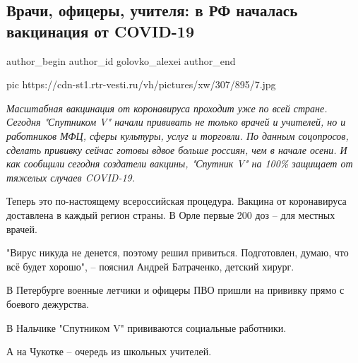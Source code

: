  
 
 
 
 
 
\subsection{Врачи, офицеры, учителя: в РФ началась вакцинация от COVID-19}
\label{sec:14_12_2020.news.ru.vesti.golovko_alexei.1.vaccination_sputnik_v}
\ifcmt
	author_begin
   author_id golovko_alexei
	author_end
\fi


\ifcmt
pic https://cdn-st1.rtr-vesti.ru/vh/pictures/xw/307/895/7.jpg
\fi

\begin{leftbar}
	\begingroup
		\em Масштабная вакцинация от коронавируса проходит уже по всей стране.
				Сегодня "Спутником V" начали прививать не только врачей и учителей, но
				и работников МФЦ, сферы культуры, услуг и торговли. По данным
				соцопросов, сделать прививку сейчас готовы вдвое больше россиян, чем в
				начале осени. И как сообщили сегодня создатели вакцины, "Спутник V" на
				100\% защищает от тяжелых случаев COVID-19.
	\endgroup
\end{leftbar}


Теперь это по-настоящему всероссийская процедура. Вакцина от коронавируса
доставлена в каждый регион страны. В Орле первые 200 доз – для местных врачей.

"Вирус никуда не денется, поэтому решил привиться. Подготовлен, думаю, что всё
будет хорошо", – пояснил Андрей Батраченко, детский хирург.

В Петербурге военные летчики и офицеры ПВО пришли на прививку прямо с боевого
дежурства.

В Нальчике "Спутником V" прививаются социальные работники.

А на Чукотке – очередь из школьных учителей.

